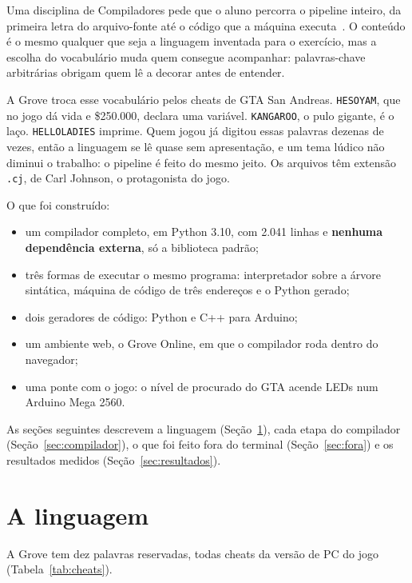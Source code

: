 \documentclass[conference]{IEEEtran}
\begin{document}
Uma disciplina de Compiladores pede que o aluno percorra o pipeline inteiro, da primeira letra do arquivo-fonte até o código que a máquina executa~\cite{aho}. O conteúdo é o mesmo qualquer que seja a linguagem inventada para o exercício, mas a escolha do vocabulário muda quem consegue acompanhar: palavras-chave arbitrárias obrigam quem lê a decorar antes de entender.

A Grove troca esse vocabulário pelos cheats de GTA San Andreas. \texttt{HESOYAM}, que no jogo dá vida e \$250.000, declara uma variável. \texttt{KANGAROO}, o pulo gigante, é o laço. \texttt{HELLOLADIES} imprime. Quem jogou já digitou essas palavras dezenas de vezes, então a linguagem se lê quase sem apresentação, e um tema lúdico não diminui o trabalho: o pipeline é feito do mesmo jeito. Os arquivos têm extensão \texttt{.cj}, de Carl Johnson, o protagonista do jogo.

O que foi construído:
\begin{itemize}
\item um compilador completo, em Python 3.10, com 2.041 linhas e \textbf{nenhuma dependência externa}, só a biblioteca padrão;
\item três formas de executar o mesmo programa: interpretador sobre a árvore sintática, máquina de código de três endereços e o Python gerado;
\item dois geradores de código: Python e C++ para Arduino;
\item um ambiente web, o Grove Online, em que o compilador roda dentro do navegador;
\item uma ponte com o jogo: o nível de procurado do GTA acende LEDs num Arduino Mega 2560.
\end{itemize}

As seções seguintes descrevem a linguagem (Seção~\ref{sec:linguagem}), cada etapa do compilador (Seção~\ref{sec:compilador}), o que foi feito fora do terminal (Seção~\ref{sec:fora}) e os resultados medidos (Seção~\ref{sec:resultados}).

\section{A linguagem}\label{sec:linguagem}

A Grove tem dez palavras reservadas, todas cheats da versão de PC do jogo (Tabela~\ref{tab:cheats}).
\end{document}
